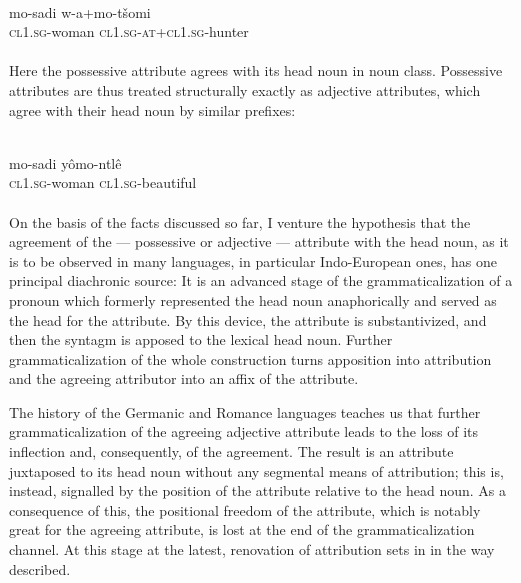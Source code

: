 \ea\label{ex:E44}
\\
\gll    mo-sadi  w-a+mo-tšomi\\
 \textsc{cl}1.\textsc{sg}-woman  \textsc{cl}1.\textsc{sg}-\textsc{at}+\textsc{cl}1.\textsc{sg}-hunter\\
\\
\z
\noindent Here the possessive attribute agrees with its head noun in noun class. Possessive attributes are thus treated structurally exactly as adjective attributes, which agree with their head noun by similar prefixes:

\ea\label{ex:E45}
\\
\gll     mo-sadi  yômo-ntlê\\
 \textsc{cl}1.\textsc{sg}-woman  \textsc{cl}1.\textsc{sg}-beautiful\\
\\
\z
\noindent \label{page77}On the basis of the facts discussed so far, I venture the hypothesis that the agreement of the — possessive or adjective — attribute with the head noun, as it is to be observed in many languages, in particular Indo-European ones, has one principal diachronic source: It is an advanced stage of the grammaticalization of a pronoun which formerly represented the head noun anaphorically and served as the head for the attribute. By this device, the attribute is substantivized, and then the syntagm is apposed to the lexical head noun. Further grammaticalization of the whole construction turns apposition into attribution and the agreeing attributor into an affix of the attribute.

The history of the Germanic and Romance languages teaches us that further grammaticalization of the agreeing adjective attribute leads to the loss of its inflection and, consequently, of the agreement. The result is an attribute juxtaposed to its head noun without any segmental means of attribution; this is, instead, signalled by the position of the attribute relative to the head noun. As a consequence of this, the positional freedom of the attribute, which is notably great for the agreeing attribute, is lost at the end of the grammaticalization channel. At this stage at the latest, renovation of attribution sets in in the way described.


